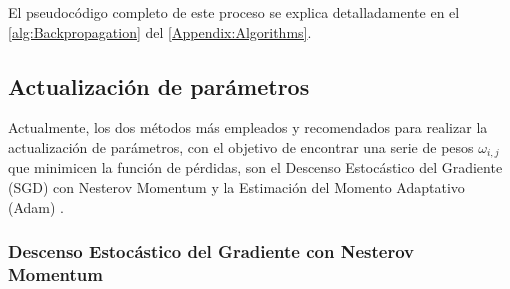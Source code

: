 El pseudocódigo completo de este proceso se explica detalladamente en el \autoref{alg:Backpropagation} del \autoref{Appendix:Algorithms}.

\subsection{Actualización de parámetros} \label{Chapter:Optimizers}

Actualmente, los dos métodos más empleados y recomendados para realizar la actualización de parámetros, con el objetivo de encontrar una serie de pesos $\omega_{i,j}$ que minimicen la función de pérdidas, son el Descenso Estocástico del Gradiente (SGD) con Nesterov Momentum y la Estimación del Momento Adaptativo (Adam) \cite{CS231n}.

\subsubsection{Descenso Estocástico del Gradiente con Nesterov Momentum}

